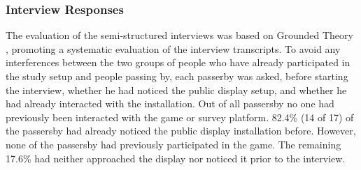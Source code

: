 	\subsubsection{Interview Responses}

	The evaluation of the semi-structured interviews was based on Grounded Theory \cite{strauss1990basics}, promoting a systematic evaluation of the interview transcripts.
	To avoid any interferences between the two groups of people who have already participated in the study setup and people passing by, each passerby was asked, before starting the interview, whether he had noticed the public display setup, and whether he had already interacted with the installation. Out of all passersby no one had previously been interacted with the game or survey platform. 82.4\% (14 of 17) of the passersby had already noticed the public display installation before. However, none of the passersby had previously participated in the game. The remaining 17.6\% had neither approached the display nor noticed it prior to the interview. 


